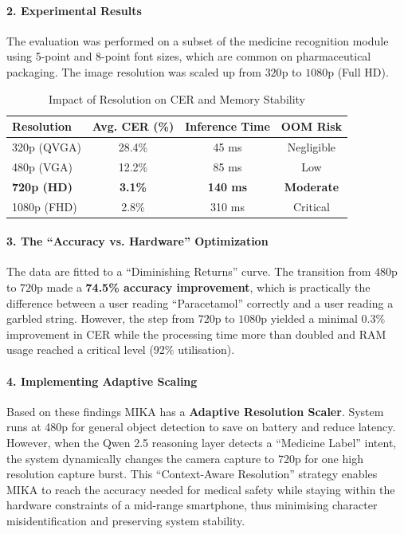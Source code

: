 \documentclass[12pt,a4paper]{report}
\begin{document}
\paragraph{2. Experimental Results}
The evaluation was performed on a subset of the medicine recognition module using 5-point and 8-point font sizes, which are common on pharmaceutical packaging. The image resolution was scaled up from $320$p to $1080$p (Full HD). 
\begin{table}[h!]
\centering
\caption{Impact of Resolution on CER and Memory Stability}
\begin{tabular}{|l|c|c|c|}
\hline
\textbf{Resolution} & \textbf{Avg. CER (\%)} & \textbf{Inference Time} & \textbf{OOM Risk} \\ \hline
320p (QVGA) & 28.4\% & 45 ms & Negligible \\ \hline
480p (VGA) & 12.2\% & 85 ms & Low \\ \hline
\textbf{720p (HD)} & \textbf{3.1\%} & \textbf{140 ms} & \textbf{Moderate} \\ \hline
1080p (FHD) & 2.8\% & 310 ms & Critical \\ \hline
\end{tabular}
\end{table}
 
\paragraph{3. The ``Accuracy vs. Hardware'' Optimization}
The data are fitted to a ``Diminishing Returns'' curve. The transition from $480$p to $720$p made a \textbf{74.5\% accuracy improvement}, which is practically the difference between a user reading ``Paracetamol'' correctly and a user reading a garbled string. However, the step from $720$p to $1080$p yielded a minimal $0.3\%$ improvement in CER while the processing time more than doubled and RAM usage reached a critical level (92\% utilisation).
\paragraph{4. Implementing Adaptive Scaling}
Based on these findings MIKA has a \textbf{Adaptive Resolution Scaler}. System runs at 480p for general object detection to save on battery and reduce latency. However, when the Qwen 2.5 reasoning layer detects a “Medicine Label” intent, the system dynamically changes the camera capture to 720p for one high resolution capture burst. This “Context-Aware Resolution” strategy enables MIKA to reach the accuracy needed for medical safety while staying within the hardware constraints of a mid-range smartphone, thus minimising character misidentification and preserving system stability.
\end{document}
